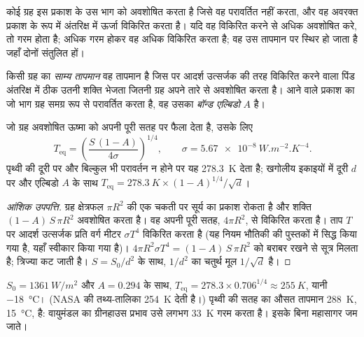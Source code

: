 कोई ग्रह इस प्रकाश के उस भाग को अवशोषित करता है जिसे वह परावर्तित नहीं करता, और वह
अवरक्त प्रकाश के रूप में अंतरिक्ष में ऊर्जा विकिरित करता है। यदि वह विकिरित करने से अधिक
अवशोषित करे, तो गरम होता है; अधिक गरम होकर वह अधिक विकिरित करता है; वह उस तापमान पर
स्थिर हो जाता है जहाँ दोनों संतुलित हों।

\begin{definition}[साम्य तापमान]\label{def:g10:habitable-planet:equilibrium-temperature}
किसी ग्रह का \emph{साम्य तापमान} वह तापमान है जिस पर आदर्श
उत्सर्जक की तरह विकिरित करने वाला पिंड अंतरिक्ष में ठीक उतनी शक्ति भेजता जितनी ग्रह अपने
तारे से अवशोषित करता है। आने वाले प्रकाश का जो भाग ग्रह समग्र रूप से परावर्तित करता है, वह
उसका \emph{बॉन्ड एल्बिडो} $A$ है।
\end{definition}

\begin{proposition}[साम्य तापमान का परिकलन]\label{prop:g10:habitable-planet:teq}
जो ग्रह अवशोषित ऊष्मा को अपनी पूरी सतह पर फैला देता है, उसके लिए
\[
  T_{\mathrm{eq}} = \left(\frac{S\,(1-A)}{4\sigma}\right)^{1/4},
  \qquad \sigma = \qty{5.67e-8}{W.m^{-2}.K^{-4}}.
\]
पृथ्वी की दूरी पर और बिल्कुल भी परावर्तन न होने पर यह
\qty{278.3}{K} देता है; खगोलीय इकाइयों में दूरी $d$ पर और एल्बिडो $A$ के साथ
$T_{\mathrm{eq}} = \qty{278.3}{K} \times (1-A)^{1/4}/\sqrt{d}$।
\end{proposition}

\begin{proof}[आंशिक उपपत्ति]
ग्रह क्षेत्रफल $\pi R^2$ की एक चकती पर सूर्य का प्रकाश रोकता है और
शक्ति $(1-A)\,S\,\pi R^2$ अवशोषित करता है। वह अपनी पूरी सतह, $4\pi R^2$, से विकिरित करता है।
ताप $T$ पर आदर्श उत्सर्जक प्रति वर्ग मीटर $\sigma T^4$ विकिरित करता है
(यह नियम भौतिकी की पुस्तकों में सिद्ध किया गया है, यहाँ स्वीकार किया गया है)।
$4\pi R^2 \sigma T^4 = (1-A)\,S\,\pi R^2$ को बराबर रखने से सूत्र मिलता है; त्रिज्या कट
जाती है। $S = S_0/d^2$ के साथ, $1/d^2$ का चतुर्थ मूल $1/\sqrt d$ है।
\end{proof}

\begin{example}[पृथ्वी]\label{ex:g10:habitable-planet:earth}
$S_0 = \qty{1361}{W/m^2}$ और $A = 0.294$ के साथ,
$T_{\mathrm{eq}} = 278.3 \times 0.706^{1/4} \approx \qty{255}{K}$, यानी
\qty{-18}{\degreeCelsius}। (NASA की तथ्य-तालिका \qty{254}{K} देती है।)
पृथ्वी की सतह का औसत तापमान \qty{288}{K},
\qty{15}{\degreeCelsius}, है: वायुमंडल का ग्रीनहाउस प्रभाव उसे लगभग \qty{33}{K}
गरम करता है। इसके बिना महासागर जम जाते।
\end{example}

